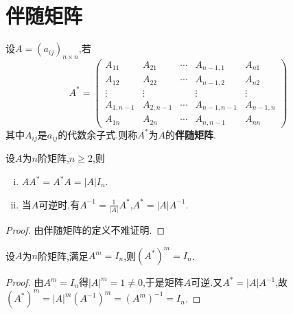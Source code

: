 \documentclass[../../main.tex]{subfiles}
\begin{document}
\section{伴随矩阵}

\begin{definition}[伴随矩阵定义]\label{definition:伴随矩阵定义}
设$A=(a_{ij})_{n\times n}$,若
\[
A^* = 
\begin{pmatrix}
A_{11} & A_{21} & \cdots & A_{n - 1,1} & A_{n1} \\
A_{12} & A_{22} & \cdots & A_{n - 1,2} & A_{n2} \\
\vdots & \vdots & & \vdots & \vdots \\
A_{1,n - 1} & A_{2,n - 1} & \cdots & A_{n - 1,n - 1} & A_{n - 1,n} \\
A_{1n} & A_{2n} & \cdots & A_{n,n - 1} & A_{nn}
\end{pmatrix}
\]
其中\(A_{ij}\)是\(a_{ij}\)的代数余子式.则称\(A^*\)为\(A\)的\textbf{伴随矩阵}.
\end{definition}

\begin{theorem}\label{theorem:伴随矩阵的基本性质}
设$A$为$n$阶矩阵,$n\geqslant  2$,则
\begin{enumerate}[(i)]
\item $AA^*=A^*A=\left| A \right|I_n$.
\item\label{伴随矩阵基本性质2} 当$A$可逆时,有$A^{-1}=\frac{1}{\left| A \right|}A^*$,$A^*=|A|A^{-1}$.
\end{enumerate}
\end{theorem}
\begin{proof}
由伴随矩阵的定义不难证明.
\end{proof}

\begin{proposition}
设\(A\)为\(n\)阶矩阵,满足\(A^m = I_n\),则\((A^*)^m = I_n\).
\end{proposition}
\begin{proof}
由\(A^m = I_n\)得\(|A|^m = 1\ne 0\),于是矩阵$A$可逆.又\(A^* = |A|A^{-1}\),故$(A^*)^m = |A|^m(A^{-1})^m = (A^m)^{-1} = I_n$.
\end{proof}
\end{document}
